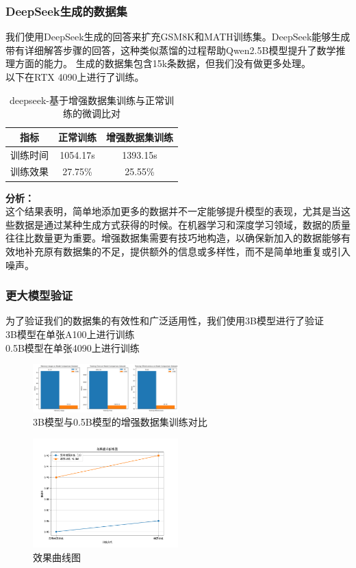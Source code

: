 \documentclass{article}
\begin{document}
\subsubsection{DeepSeek生成的数据集}
我们使用DeepSeek生成的回答来扩充GSM8K和MATH训练集。DeepSeek能够生成带有详细解答步骤的回答，这种类似蒸馏的过程帮助Qwen2.5B模型提升了数学推理方面的能力。
生成的数据集包含15k条数据，但我们没有做更多处理。
\\以下在RTX 4090上进行了训练。
\begin{table}[H]
  \caption{deepseek-基于增强数据集训练与正常训练的微调比对}
  \label{deepseek-augmentation-comparison-table}
  \centering
  \begin{tabular}{|c|c|c|}
    \hline
    \textbf{指标} & \textbf{正常训练} & \textbf{增强数据集训练} \\ \hline
    训练时间 & 1054.17s & 1393.15s \\ \hline
    训练效果 & 27.75\% & 25.55\% \\ \hline
  \end{tabular}
\end{table}

\textbf{分析：}\\
这个结果表明，简单地添加更多的数据并不一定能够提升模型的表现，尤其是当这些数据是通过某种生成方式获得的时候。在机器学习和深度学习领域，数据的质量往往比数量更为重要。增强数据集需要有技巧地构造，以确保新加入的数据能够有效地补充原有数据集的不足，提供额外的信息或多样性，而不是简单地重复或引入噪声。


\subsubsection{更大模型验证}
为了验证我们的数据集的有效性和广泛适用性，我们使用3B模型进行了验证
\\ 3B模型在单张A100上进行训练
\\ 0.5B模型在单张4090上进行训练
\begin{figure}[H]
  \centering
  \includegraphics[width=0.5\textwidth]{scaling_graph.png} %
  \caption{3B模型与0.5B模型的增强数据集训练对比} %
  \label{fig:my_label2} %
\end{figure}

\begin{figure}[H]
  \centering
  \includegraphics[width=0.5\textwidth]{compare_graph.png} %
  \caption{效果曲线图} %
  \label{fig:my_label1} %
\end{figure}
\end{document}
